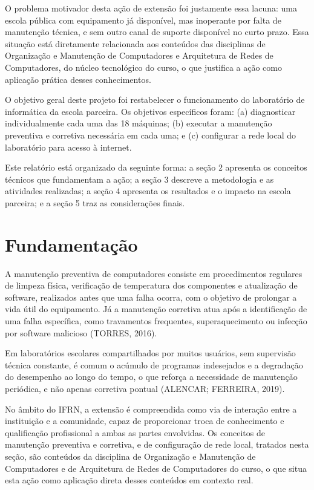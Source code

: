 \documentclass[article,12pt,a4paper,oneside]{abntex2}
\begin{document}
O problema motivador desta ação de extensão foi justamente essa lacuna:
uma escola pública com equipamento já disponível, mas inoperante por falta
de manutenção técnica, e sem outro canal de suporte disponível no curto
prazo. Essa situação está diretamente relacionada aos conteúdos das
disciplinas de Organização e Manutenção de Computadores e Arquitetura de
Redes de Computadores, do núcleo tecnológico do curso, o que justifica a
ação como aplicação prática desses conhecimentos.

O objetivo geral deste projeto foi restabelecer o funcionamento do
laboratório de informática da escola parceira. Os objetivos específicos
foram: (a) diagnosticar individualmente cada uma das 18 máquinas; (b)
executar a manutenção preventiva e corretiva necessária em cada uma; e (c)
configurar a rede local do laboratório para acesso à internet.

Este relatório está organizado da seguinte forma: a seção 2 apresenta os
conceitos técnicos que fundamentam a ação; a seção 3 descreve a
metodologia e as atividades realizadas; a seção 4 apresenta os resultados
e o impacto na escola parceira; e a seção 5 traz as considerações finais.

\section{Fundamentação}

A manutenção preventiva de computadores consiste em procedimentos
regulares de limpeza física, verificação de temperatura dos componentes e
atualização de software, realizados antes que uma falha ocorra, com o
objetivo de prolongar a vida útil do equipamento. Já a manutenção
corretiva atua após a identificação de uma falha específica, como
travamentos frequentes, superaquecimento ou infecção por software
malicioso (TORRES, 2016).

Em laboratórios escolares compartilhados por muitos usuários, sem
supervisão técnica constante, é comum o acúmulo de programas indesejados e
a degradação do desempenho ao longo do tempo, o que reforça a necessidade
de manutenção periódica, e não apenas corretiva pontual (ALENCAR;
FERREIRA, 2019).

No âmbito do IFRN, a extensão é compreendida como via de interação entre a
instituição e a comunidade, capaz de proporcionar troca de conhecimento e
qualificação profissional a ambas as partes envolvidas. Os conceitos de
manutenção preventiva e corretiva, e de configuração de rede local,
tratados nesta seção, são conteúdos da disciplina de Organização e
Manutenção de Computadores e de Arquitetura de Redes de Computadores do
curso, o que situa esta ação como aplicação direta desses conteúdos em
contexto real.
\end{document}
